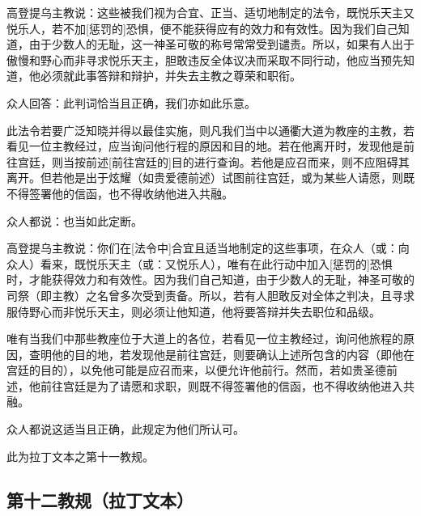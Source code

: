 高登提乌主教说：这些被我们视为合宜、正当、适切地制定的法令，既悦乐天主又悦乐人，若不加[惩罚的]恐惧，便不能获得应有的效力和有效性。因为我们自己知道，由于少数人的无耻，这一神圣可敬的称号常常受到谴责。所以，如果有人出于傲慢和野心而非寻求悦乐天主，胆敢违反全体议决而采取不同行动，他应当预先知道，他必须就此事答辩和辩护，并失去主教之尊荣和职衔。\par

众人回答：此判词恰当且正确，我们亦如此乐意。\par

此法令若要广泛知晓并得以最佳实施，则凡我们当中以通衢大道为教座的主教，若看见一位主教经过，应当询问他行程的原因和目的地。若在他离开时，发现他是前往宫廷，则当按前述[前往宫廷的]目的进行查询。若他是应召而来，则不应阻碍其离开。但若他是出于炫耀（如贵爱德前述）试图前往宫廷，或为某些人请愿，则既不得签署他的信函，也不得收纳他进入共融。\par

众人都说：也当如此定断。\par

高登提乌主教说：你们在[法令中]合宜且适当地制定的这些事项，在众人（或：向众人）看来，既悦乐天主（或：又悦乐人），唯有在此行动中加入[惩罚的]恐惧时，才能获得效力和有效性。因为我们自己知道，由于少数人的无耻，神圣可敬的司祭（即主教）之名曾多次受到责备。所以，若有人胆敢反对全体之判决，且寻求服侍野心而非悦乐天主，则必须让他知道，他将要答辩并失去职位和品级。\par

唯有当我们中那些教座位于大道上的各位，若看见一位主教经过，询问他旅程的原因，查明他的目的地，若发现他是前往宫廷，则要确认上述所包含的内容（即他在宫廷的目的），以免他可能是应召而来，以便允许他前行。然而，若如贵圣德前述，他前往宫廷是为了请愿和求职，则既不得签署他的信函，也不得收纳他进入共融。\par

众人都说这适当且正确，此规定为他们所认可。\par

此为拉丁文本之第十一教规。\par


\subsection{第十二教规（拉丁文本）}

